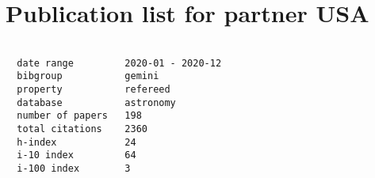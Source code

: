 \documentclass[twocolumn,linenumbers]{aastex631}
\begin{document}
\section*{Publication list for partner USA}

\begin{verbatim}

  date range         2020-01 - 2020-12
  bibgroup           gemini
  property           refereed
  database           astronomy
  number of papers   198
  total citations    2360
  h-index            24
  i-10 index         64
  i-100 index        3

\end{verbatim}

\vspace{4cm}

\nocite{*}


\end{document}
